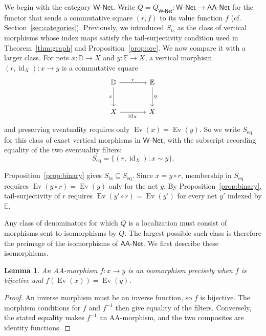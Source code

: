 \documentclass[11pt,a4paper]{article}
\newtheorem{lemma}[theorem]{Lemma}
\theoremstyle{definition}
\theoremstyle{remark}
\newcommand{\Wpar}{\mathsf{W\text{-}Net}}
\newcommand{\NetAA}{\mathsf{AA\text{-}Net}}
\newcommand{\Ev}{\operatorname{Ev}}
\newcommand{\id}{\operatorname{id}}
\newcommand{\Sts}{S_{\mathrm{ts}}}
\newcommand{\Seq}{S_{\mathrm{eq}}}
\begin{document}
We begin with the category \(\Wpar\). Write
\(Q=Q_{\Wpar}:\Wpar\to\NetAA\) for the functor that
sends a commutative square \((r,f)\) to its value
function \(f\) (cf. Section~\ref{sec:categories}).
Previously, we introduced \(\Sts\) as the class of vertical morphisms
whose index maps satisfy the tail-surjectivity condition used in
Theorem~\ref{thm:graph} and Proposition~\ref{prop:ore}.
We now compare it with a larger class. For nets \(x:\mathbb D\to X\) and
\(y:\mathbb E\to X\), a vertical morphism \((r,\id_X):x\to y\) is a
commutative square
\begin{equation}\label{eq:verticalsquare}
 \begin{tikzcd}[row sep=large,column sep=large]
 \mathbb{D}\arrow[r,"r"]\arrow[d,"x"']&\mathbb{E}\arrow[d,"y"]\\
 X\arrow[r,"\id_X"']&X
 \end{tikzcd}
\end{equation}
and preserving eventuality requires only
\(\Ev(x)=\Ev(y)\). So we write \(\Seq\) for this class of
exact vertical morphisms in \(\Wpar\), with the subscript
recording equality of the two eventuality filters:
\begin{equation}\label{eq:seq}
 \Seq=\{(r,\id_X):x\sim y\}.
\end{equation}

Proposition~\ref{prop:binary} gives \(\Sts\subseteq\Seq\).
Since \(x=y\circ r\), membership in \(\Seq\) requires
\(\Ev(y\circ r)=\Ev(y)\) only for the net \(y\). By
Proposition~\ref{prop:binary}, tail-surjectivity of \(r\) requires
\(\Ev(y'\circ r)=\Ev(y')\) for every net \(y'\) indexed by
\(\mathbb E\).

Any class of denominators for which \(Q\) is a localization must
consist of morphisms sent to isomorphisms by \(Q\). The largest possible
such class is therefore the preimage of the isomorphisms of
\(\NetAA\). We first describe these isomorphisms.

\begin{lemma}\label{lem:iso}
An AA-morphism \(f:x\to y\) is an isomorphism precisely when
\(f\) is bijective and \(f(\Ev(x))=\Ev(y)\).
\end{lemma}
\begin{proof}
An inverse morphism must be an inverse function, so \(f\) is bijective.
The morphism conditions for \(f\) and \(f^{-1}\) then give equality
of the filters. Conversely, the stated equality makes \(f^{-1}\)
an AA-morphism, and the two composites are identity functions.
\end{proof}
\end{document}
